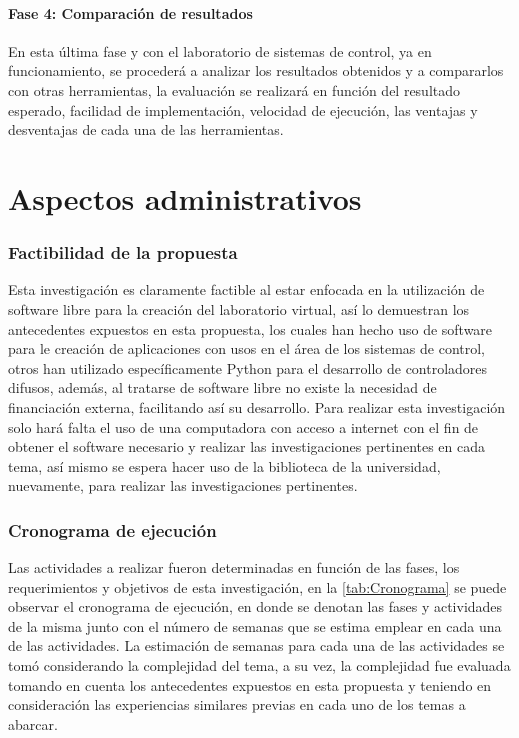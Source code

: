 	\paragraph{Fase 4: Comparación de resultados}
		
		En esta última fase y con el laboratorio de sistemas de control, ya en funcionamiento, se procederá a analizar los resultados obtenidos y a compararlos con otras herramientas, la evaluación se realizará en función del resultado esperado, facilidad de implementación, velocidad de ejecución, las ventajas y desventajas de cada una de las herramientas.

\section{Aspectos administrativos}

		\subsubsection{Factibilidad de la propuesta}

		Esta investigación es claramente factible al estar enfocada en la utilización de software libre para la creación del laboratorio virtual, así lo demuestran los antecedentes expuestos en esta propuesta, los cuales han hecho uso de software para le creación de aplicaciones con usos en el área de los sistemas de control, otros han utilizado específicamente Python para el desarrollo de controladores difusos, además, al tratarse de software libre no existe la necesidad de financiación externa, facilitando así su desarrollo. Para realizar esta investigación solo hará falta el uso de una computadora con acceso a internet con el fin de obtener el software necesario y realizar las investigaciones pertinentes en cada tema, así mismo se espera hacer uso de la biblioteca de la universidad, nuevamente, para realizar las investigaciones pertinentes.
		
	\subsubsection{Cronograma de ejecución}

		Las actividades a realizar fueron determinadas en función de las fases, los requerimientos y objetivos de esta investigación, en la \cref{tab:Cronograma} se puede observar el cronograma de ejecución, en donde se denotan las fases y actividades de la misma junto con el número de semanas que se estima emplear en cada una de las actividades. La estimación de semanas para cada una de las actividades se tomó considerando la complejidad del tema, a su vez, la complejidad fue evaluada tomando en cuenta los antecedentes expuestos en esta propuesta y teniendo en consideración las experiencias similares previas en cada uno de los temas a abarcar.

